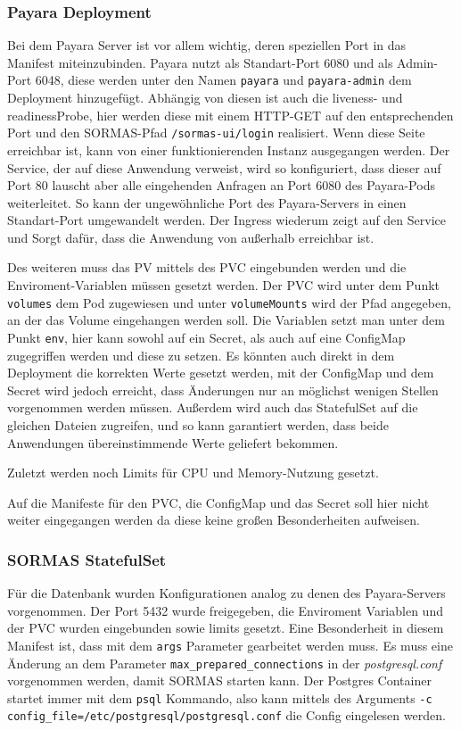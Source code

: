 \hfill \newline
\subsubsection{Payara Deployment}
Bei dem Payara Server ist vor allem wichtig, deren speziellen Port in das Manifest miteinzubinden.
Payara nutzt als Standart-Port 6080 und als Admin-Port 6048, diese werden unter den Namen \texttt{payara} und \texttt{payara-admin} dem Deployment hinzugefügt.
Abhängig von diesen ist auch die liveness- und readinessProbe, hier werden diese mit einem \ac{HTTP}-GET auf den entsprechenden Port und den \ac{SORMAS}-Pfad \texttt{/sormas-ui/login} realisiert.
Wenn diese Seite erreichbar ist, kann von einer funktionierenden Instanz ausgegangen werden.
Der Service, der auf diese Anwendung verweist, wird so konfiguriert, dass dieser auf Port 80 lauscht aber alle eingehenden Anfragen an Port 6080 des Payara-Pods weiterleitet.
So kann der ungewöhnliche Port des Payara-Servers in einen Standart-Port umgewandelt werden. 
Der Ingress wiederum zeigt auf den Service und Sorgt dafür, dass die Anwendung von außerhalb erreichbar ist.

Des weiteren muss das \ac{PV} mittels des \ac{PVC} eingebunden werden und die Enviroment-Variablen müssen gesetzt werden. 
Der \ac{PVC} wird unter dem Punkt \texttt{volumes} dem Pod zugewiesen und unter \texttt{volumeMounts} wird der Pfad angegeben, an der das Volume eingehangen werden soll. 
Die Variablen setzt man unter dem Punkt \texttt{env}, hier kann sowohl auf ein Secret, als auch auf eine ConfigMap zugegriffen werden und diese zu setzen.
Es könnten auch direkt in dem Deployment die korrekten Werte gesetzt werden, mit der ConfigMap und dem Secret wird jedoch erreicht, dass Änderungen nur an möglichst wenigen Stellen vorgenommen werden müssen.
Außerdem wird auch das StatefulSet auf die gleichen Dateien zugreifen, und so kann garantiert werden, dass beide Anwendungen übereinstimmende Werte geliefert bekommen.

Zuletzt werden noch Limits für \ac{CPU} und Memory-Nutzung gesetzt. 

Auf die Manifeste für den \ac{PVC}, die ConfigMap und das Secret soll hier nicht weiter eingegangen werden da diese keine großen Besonderheiten aufweisen. 

\hfill \newline
\subsubsection{SORMAS StatefulSet}
Für die Datenbank wurden Konfigurationen analog zu denen des Payara-Servers vorgenommen.
Der Port 5432 wurde freigegeben, die Enviroment Variablen und der \ac{PVC} wurden eingebunden sowie limits gesetzt.
Eine Besonderheit in diesem Manifest ist, dass mit dem \texttt{args} Parameter gearbeitet werden muss. 
Es muss eine Änderung an dem Parameter \texttt{max\_prepared\_connections} in der \textit{postgresql.conf} vorgenommen werden, damit \ac{SORMAS} starten kann. 
Der Postgres Container startet immer mit dem \texttt{psql} Kommando, also kann mittels des Arguments \texttt{-c config\_file=/etc/postgresql/postgresql.conf} die Config eingelesen werden.

